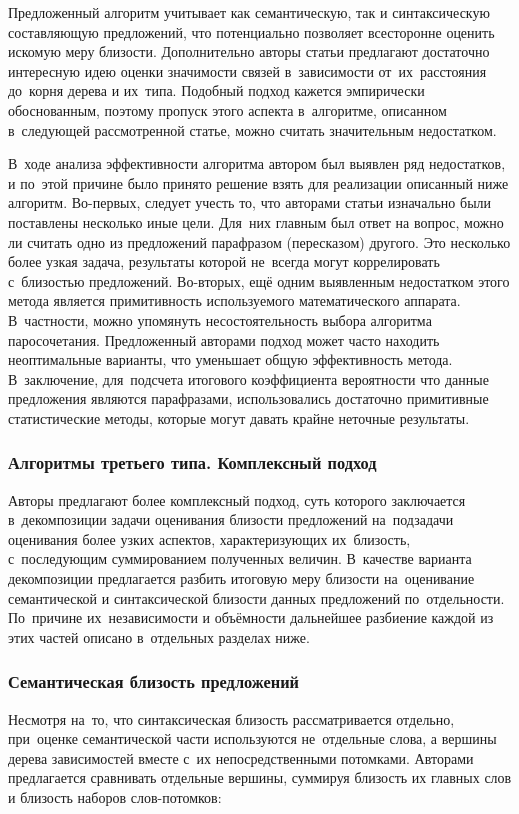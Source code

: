 Предложенный алгоритм учитывает как семантическую, так и синтаксическую составляющую предложений, 
что потенциально позволяет всесторонне оценить искомую меру близости.
Дополнительно авторы статьи предлагают достаточно интересную идею оценки значимости связей
в~зависимости от~их~расстояния до~корня дерева и их~типа.
Подобный подход кажется эмпирически обоснованным, 
поэтому пропуск этого аспекта в~алгоритме,
описанном в~следующей рассмотренной статье, можно считать значительным недостатком.

В~ходе анализа эффективности алгоритма автором был выявлен ряд недостатков,
и по~этой причине было принято решение взять для реализации описанный ниже алгоритм.
Во-первых, следует учесть то, что авторами статьи\cite{weightedDep} изначально были поставлены несколько иные цели. 
Для~них главным был ответ на вопрос, можно ли считать одно из предложений парафразом (пересказом) другого. 
Это несколько более узкая задача,
результаты которой не~всегда могут коррелировать с~близостью предложений.
Во-вторых, ещё одним выявленным недостатком этого метода является примитивность используемого математического аппарата. 
В~частности, можно упомянуть несостоятельность выбора алгоритма паросочетания. 
Предложенный авторами подход может часто находить неоптимальные варианты,
что уменьшает общую эффективность метода. 
В~заключение, для~подсчета итогового коэффициента вероятности что данные предложения
являются парафразами, использовались достаточно примитивные статистические методы,
которые могут давать крайне неточные результаты.

\subsubsection{Алгоритмы третьего типа. Комплексный подход}
\label{sec:complex_algorithm}
Авторы \cite{complexSim} предлагают более комплексный подход, 
суть которого заключается в~декомпозиции задачи
оценивания близости предложений на~подзадачи оценивания более узких аспектов, 
характеризующих их~близость, с~последующим суммированием полученных величин.
В~качестве варианта декомпозиции предлагается разбить итоговую меру близости 
на~оценивание семантической и синтаксической близости данных предложений по~отдельности.
По~причине их~независимости и объёмности дальнейшее разбиение
каждой из этих частей описано в~отдельных разделах ниже.

\subsubsection{Семантическая близость предложений}
\label{sec:semantic_similarity}
Несмотря на~то, что синтаксическая близость рассматривается отдельно, 
при~оценке семантической части используются не~отдельные слова, 
а вершины дерева зависимостей вместе с~их непосредственными потомками.
Авторами предлагается сравнивать отдельные вершины, суммируя близость их главных слов и близость наборов слов-потомков:

